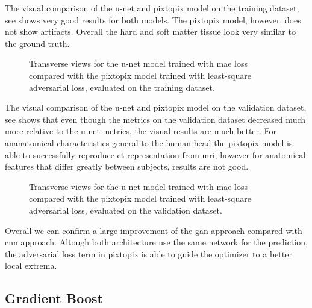 The visual comparison of the u-net and pixtopix model on the training dataset,
see  shows very good results for both models.
The pixtopix model, however, does not show artifacts. Overall the hard and
soft matter tissue look very similar to the ground truth.
\begin{figure}[h]
  \centering
  \begin{adjustbox}{width=\linewidth}
  \end{adjustbox}
  \caption{Transverse views for the u-net model trained with \acrshort{mae}
    loss compared with the pixtopix model trained with least-square adversarial
    loss, evaluated on the training dataset.
  }\label{fig:unet_pixtopix:training}
\end{figure}
The visual comparison of the u-net and pixtopix model on the validation
dataset, see  shows that even though the
metrics on the validation dataset decreased much more relative to the u-net
metrics, the visual results are much better. For ananatomical characteristics
general to the human head the pixtopix model is able to successfully reproduce
\gls{ct} representation from \gls{mri}, however for anatomical features that
differ greatly between subjects, results are not good.
\begin{figure}[h]
  \centering
  \begin{adjustbox}{width=\linewidth}
  \end{adjustbox}
  \caption{Transverse views for the u-net model trained with \acrshort{mae}
    loss compared with the pixtopix model trained with least-square adversarial
    loss, evaluated on the validation dataset.
  }\label{fig:unet_pixtopix:validation}
\end{figure}
Overall we can confirm a large improvement of the \gls{gan} approach compared
with \gls{cnn} approach. Altough both architecture use the same network for
the prediction, the adversarial loss term in pixtopix is able to guide the
optimizer to a better local extrema.

\subsection{Gradient Boost}

